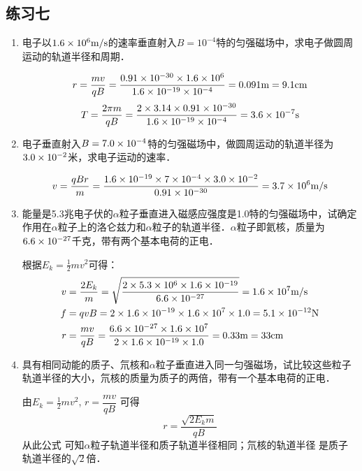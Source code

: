 \subsection{练习七}
\begin{enumerate}
    \item 电子以$1.6\times10^6\text{m}/\text{s}$的速率垂直射入$B=10^{-4}$特的匀强磁场中，求电子做圆周运动的轨道半径和周期．


    \begin{solution}
\[r=\frac{mv}{qB}=\frac{0.91\times 10^{-30}\times 1.6\times 10^6}{1.6\times 10^{-19}\times 10^{-4}}=0.091{\rm m}=9.1{\rm cm}\]
\[T=\frac{2\pi m}{qB}=\frac{2\times 3.14\times 0.91\times 10^{-30}}{1.6\times 10^{-19}\times 10^{-4}}=3.6\times 10^{-7}{\rm s}\]
    \end{solution}
    
    \item 电子垂直射入$B=7.0\times10^{-4}$特的匀强磁场中，做圆周运动的轨道半径为$3.0\times10^{-2}$米，求电子运动的速率．


    \begin{solution}
\[v=\frac{qBr}{m}=\frac{1.6\times 10^{-19}\times 7\times 10^{-4}\times 3.0\times 10^{-2}}{0.91\times 10^{-30}}=3.7\times 10^6\text{m}/\text{s} \]
    \end{solution}
    
    \item 能量是5.3兆电子伏的$\alpha$粒子垂直进入磁感应强度是1.0特的匀强磁场中，试确定作用在$\alpha$粒子上的洛仑兹力和$\alpha$粒子的轨道半径．$\alpha$粒子即氦核，质量为$6.6\times10^{-27}$千克，带有两个基本电荷的正电．


    \begin{solution}
    根据$E_k=\frac{1}{2}mv^2$可得：
\[\begin{split}
    v&=\frac{2E_k}{m}=\sqrt{\frac{2\times 5.3\times 10^6\times 1.6\times 10^{-19}}{6.6\times 10^{-27}}}=1.6\times 10^7\text{m}/\text{s}\\
f&=qvB=2\times 1.6\times 10^{-19}\times 1.6\times 10^7\times 1.0=5.1\times 10^{-12}{\rm N}\\
r&=\frac{mv}{qB}=\frac{6.6\times 10^{-27}\times 1.6\times 10^7}{2\times 1.6\times 10^{-19}\times 1.0}=0.33{\rm m}=33{\rm cm}
\end{split}\]
    \end{solution}
    
    \item 具有相同动能的质子、氘核和$\alpha$粒子垂直进入同一匀强磁场，试比较这些粒子轨道半径的大小，氘核的质量为质子的两倍，带有一个基本电荷的正电．


    \begin{solution}
    由$E_k=\frac{1}{2}mv^2$, $r=\dfrac{mv}{qB}$
可得
\[r=\frac{\sqrt{2E_k m}}{qB}\]
从此公式
可知$\alpha$粒子轨道半径和质子轨道半径相同；氘核的轨道半径
是质子轨道半径的$\sqrt{2}$倍．
    \end{solution}
    

\end{enumerate}
